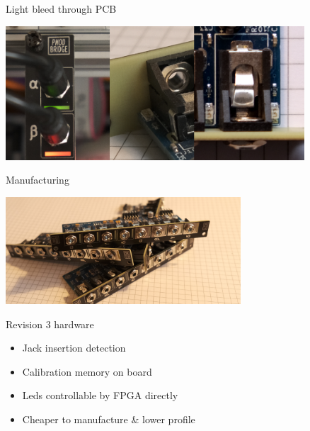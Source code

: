 \documentclass[aspectratio=169]{beamer}
\begin{document}
\begin{frame}{Light bleed through PCB}


    \begin{center}
        \includegraphics[height=5cm]{img/led_guide.png}
    \end{center}

\end{frame}

\begin{frame}{Manufacturing}

    \begin{center}
        \includegraphics[height=4cm]{img/mfg_stack.png}
    \end{center}

    \begin{block}{Revision 3 hardware}
        \begin{itemize}
            \item Jack insertion detection
            \item Calibration memory on board
            \item Leds controllable by FPGA directly
            \item Cheaper to manufacture \& lower profile
        \end{itemize}
    \end{block}

\end{frame}
\end{document}
